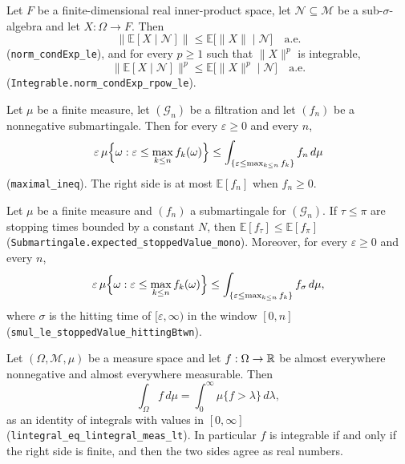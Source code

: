 \begin{proposition}
Let $F$ be a finite-dimensional real inner-product space, let
$\mathcal N\subseteq\mathcal M$ be a sub-$\sigma$-algebra and let
$X:\Omega\to F$. Then
\[
  \bigl\|\mathbb E[X\mid\mathcal N]\bigr\|
    \le\mathbb E\bigl[\|X\|\mid\mathcal N\bigr]\quad\text{a.e.}
\]
(\texttt{norm\_condExp\_le}), and for every $p\ge1$ such that $\|X\|^p$ is
integrable,
\[
  \bigl\|\mathbb E[X\mid\mathcal N]\bigr\|^p
    \le\mathbb E\bigl[\|X\|^p\mid\mathcal N\bigr]\quad\text{a.e.}
\]
(\texttt{Integrable.norm\_condExp\_rpow\_le}).
\end{proposition}

\begin{proposition}
Let $\mu$ be a finite measure, let $(\mathcal G_n)$ be a filtration and let
$(f_n)$ be a nonnegative submartingale. Then for every $\varepsilon\ge0$ and
every $n$,
\[
  \varepsilon\,\mu\Bigl\{\omega:\varepsilon\le\max_{k\le n}f_k(\omega)\Bigr\}
   \le\int_{\{\varepsilon\le\max_{k\le n}f_k\}}f_n\,d\mu
\]
(\texttt{maximal\_ineq}). The right side is at most $\mathbb E[f_n]$ when
$f_n\ge0$.
\end{proposition}

\begin{proposition}
Let $\mu$ be a finite measure and $(f_n)$ a submartingale for $(\mathcal G_n)$.
If $\tau\le\pi$ are stopping times bounded by a constant $N$, then
$\mathbb E[f_\tau]\le\mathbb E[f_\pi]$
(\texttt{Submartingale.expected\_stoppedValue\_mono}). Moreover, for every
$\varepsilon\ge0$ and every $n$,
\[
  \varepsilon\,\mu\Bigl\{\omega:\varepsilon\le\max_{k\le n}f_k(\omega)\Bigr\}
   \le\int_{\{\varepsilon\le\max_{k\le n}f_k\}}
       f_{\sigma}\,d\mu,
\]
where $\sigma$ is the hitting time of $[\varepsilon,\infty)$ in the window
$[0,n]$ (\texttt{smul\_le\_stoppedValue\_hittingBtwn}).
\end{proposition}

\begin{proposition}
Let $(\Omega,\mathcal M,\mu)$ be a measure space and let $f:\Omega\to\mathbb{R}$ be
almost everywhere nonnegative and almost everywhere measurable. Then
\[
  \int_\Omega f\,d\mu=\int_0^\infty\mu\{f>\lambda\}\,d\lambda,
\]
as an identity of integrals with values in $[0,\infty]$
(\texttt{lintegral\_eq\_lintegral\_meas\_lt}). In particular $f$ is integrable
if and only if the right side is finite, and then the two sides agree as real
numbers.
\end{proposition}

